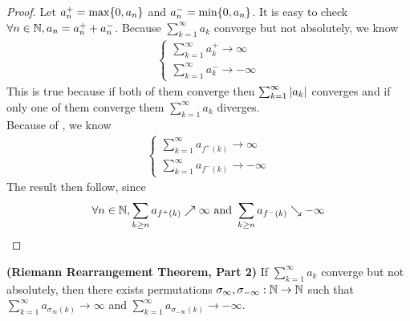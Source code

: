 \documentclass{report}
\begin{document}
\begin{proof}
Let $a_n^+=\max \{ 0,a_n \}$ and $a_n^-=\min \{ 0,a_n \}$. It is easy to check $\forall n\in\mathbb{N}, a_n=a_n^++a_n^-$. Because $\sum_{k=1}^\infty a_k$ converge but not absolutely, we know 
\begin{align}
\label{e9}
\begin{cases}
  \sum_{k=1}^\infty a_k^+\to\infty\\
  \sum_{k=1}^\infty a_k^-\to-\infty
\end{cases}
\end{align}
This is true because if both of them converge then $\sum_{k=1}^\infty \left|a_k\right|$ converges and if only one of them converge them $\sum_{k=1}^\infty a_k$ diverges.\\


Because of  , we know 
\begin{align*}
\begin{cases}
  \sum_{k=1}^\infty a_{f^+(k)}\to \infty\\
  \sum_{k=1}^\infty a_{f^-(k)}\to -\infty
\end{cases}
\end{align*}
The result then follow, since 
\begin{align*}
\forall n\in\mathbb{N}, \sum_{k\geq n}a_{f^+(k)}\nearrow \infty \text{ and }\sum_{k\geq n}a_{f^-(k)}\searrow -\infty
\end{align*}
\end{proof}
\begin{theorem}
\label{t1}
\textbf{(Riemann Rearrangement Theorem, Part 2)} If $\sum_{k=1}^\infty a_k$ converge but not absolutely, then there exists permutations $\sigma_{\infty}, \sigma_{-\infty}:\mathbb{N}\rightarrow \mathbb{N}$ such that $\sum_{k=1}^\infty a_{\sigma_\infty(k)}\to\infty$ and $\sum_{k=1}^\infty a_{\sigma_{-\infty}(k)}\to-\infty$. 
\end{theorem}
\end{document}
